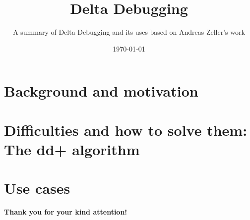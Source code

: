 


\title[Delta Debugging]{Delta Debugging}
\subtitle{A summary of Delta Debugging and its uses based on Andreas Zeller's work}
\date{\today}




\titleframe

\section{Background and motivation}


\section{Difficulties and how to solve them: The dd+ algorithm}



\section{Use cases}



\begin{frame}
	\begin{center}
		\large \textbf{Thank you for your kind attention!}
	\end{center}
\end{frame}

%

%

